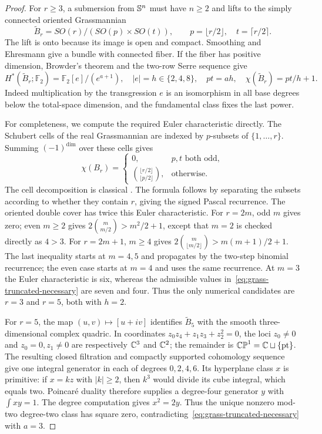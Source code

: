 \begin{proof}
For $r\geq3$, a submersion from $\mathbb S^n$ must have $n\geq2$ and lifts
to the simply connected oriented Grassmannian
\[
 \widetilde B_r=SO(r)/(SO(p)\times SO(t)),\qquad
 p=\lfloor r/2\rfloor,\quad t=\lceil r/2\rceil.
\]
The lift is onto because its image is open and compact. Smoothing and
Ehresmann give a bundle with connected fiber. If the fiber has positive
dimension, Browder's theorem and the two-row Serre sequence give
\begin{equation}\label{eq:grass-truncated-necessary}
 H^*(\widetilde B_r;\mathbb F_2)
   =\mathbb F_2[e]/(e^{a+1}),\quad
 |e|=h\in\{2,4,8\},\quad
 pt=ah,\quad\chi(\widetilde B_r)=pt/h+1.
\end{equation}
Indeed multiplication by the transgression $e$ is an isomorphism in
all base degrees below the total-space dimension, and the fundamental
class fixes the last power.

For completeness, we compute the required Euler characteristic directly.
The Schubert cells of the real Grassmannian are indexed by $p$-subsets of
$\{1,\ldots,r\}$. Summing $(-1)^{\dim}$ over these cells gives
\[
 \chi(B_r)=
 \begin{cases}0,&p,t\text{ both odd},\\
 \binom{\lfloor r/2\rfloor}{\lfloor p/2\rfloor},&\text{otherwise}.
 \end{cases}
\]
The cell decomposition is classical \cite[Section~6]{MilnorStasheff1974}.
The formula follows by separating the subsets according to whether they contain
$r$, giving the signed Pascal recurrence. The oriented double cover has
twice this Euler characteristic. For $r=2m$, odd $m$ gives zero;
even $m\geq2$ gives $2\binom m{m/2}>m^2/2+1$, except that $m=2$
is checked directly as $4>3$. For $r=2m+1$, $m\geq4$ gives
$2\binom m{\lfloor m/2\rfloor}>m(m+1)/2+1$.
The last inequality starts at $m=4,5$ and propagates by the two-step
binomial recurrence; the even case starts at $m=4$ and uses the same
recurrence. At $m=3$ the Euler characteristic is six, whereas the
admissible values in~\eqref{eq:grass-truncated-necessary} are seven
and four. Thus the only numerical candidates are $r=3$ and $r=5$,
both with $h=2$.

For $r=5$, the map $(u,v)\mapsto[u+iv]$ identifies
$\widetilde B_5$ with the smooth three-dimensional complex quadric.
In coordinates $z_0z_4+z_1z_3+z_2^2=0$, the loci $z_0\ne0$ and
$z_0=0,z_1\ne0$ are respectively $\mathbb C^3$ and $\mathbb C^2$; the remainder
is $\mathbb{CP}^1=\mathbb C\sqcup\{\mathrm{pt}\}$.
The resulting closed filtration and compactly supported cohomology
sequence give one integral generator in each of degrees $0,2,4,6$.
Its hyperplane class $x$ is primitive: if $x=kz$ with $|k|\geq2$,
then $k^3$ would divide its cube integral, which equals two.
Poincar\'e duality therefore supplies a degree-four generator $y$ with
$\int xy=1$. The degree computation gives
$x^2=2y$. Thus the unique nonzero mod-two degree-two class has square
zero, contradicting~\eqref{eq:grass-truncated-necessary} with $a=3$.


\end{proof}
